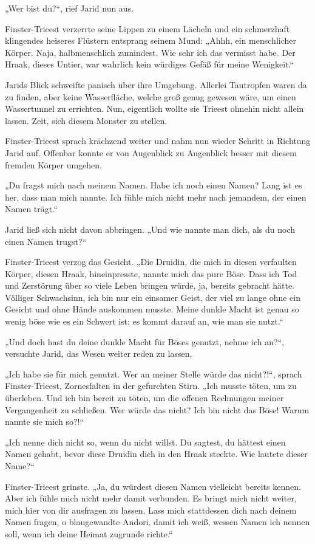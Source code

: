 „Wer bist du?“, rief Jarid nun aus.

Finster-Trieest verzerrte seine Lippen zu einem Lächeln und ein schmerzhaft klingendes heiseres Flüstern entsprang seinem Mund: „Ahhh, ein menschlicher Körper. Naja, halbmenschlich zumindest. Wie sehr ich das vermisst habe. Der Hraak, dieses Untier, war wahrlich kein würdiges Gefäß für meine Wenigkeit.“

Jarids Blick schweifte panisch über ihre Umgebung. Allerlei Tautropfen waren da zu finden, aber keine Wasserfläche, welche groß genug gewesen wäre, um einen Wassertunnel zu errichten. Nun, eigentlich wollte sie Trieest ohnehin nicht allein lassen. Zeit, sich diesem Monster zu stellen.

Finster-Trieest sprach krächzend weiter und nahm nun wieder Schritt in Richtung Jarid auf. Offenbar konnte er von Augenblick zu Augenblick besser mit diesem fremden Körper umgehen.

„Du fragst mich nach meinem Namen. Habe ich noch einen Namen? Lang ist es her, dass man mich nannte. Ich fühle mich nicht mehr nach jemandem, der einen Namen trägt.“

Jarid ließ sich nicht davon abbringen. „Und wie nannte man dich, als du noch einen Namen trugst?“

Finster-Trieest verzog das Gesicht. „Die Druidin, die mich in diesen verfaulten Körper, diesen Hraak, hineinpresste, nannte mich das pure Böse. Dass ich Tod und Zerstörung über so viele Leben bringen würde, ja, bereits gebracht hätte. Völliger Schwachsinn, ich bin nur ein einsamer Geist, der viel zu lange ohne ein Gesicht und ohne Hände auskommen musste. Meine dunkle Macht ist genau so wenig böse wie es ein Schwert ist; es kommt darauf an, wie man sie nutzt.“

„Und doch hast du deine dunkle Macht für Böses genutzt, nehme ich an?“, versuchte Jarid, das Wesen weiter reden zu lassen,

„Ich habe sie für mich genutzt. Wer an meiner Stelle würde das nicht?!“, sprach Finster-Trieest, Zornesfalten in der gefurchten Stirn. „Ich musste töten, um zu überleben. Und ich bin bereit zu töten, um die offenen Rechnungen meiner Vergangenheit zu schließen. Wer würde das nicht? Ich bin nicht das Böse! Warum nannte sie mich so?!“

„Ich nenne dich nicht so, wenn du nicht willst. Du sagtest, du hättest einen Namen gehabt, bevor diese Druidin dich in den Hraak steckte. Wie lautete dieser Name?“

Finster-Trieest grinste. „Ja, du würdest diesen Namen vielleicht bereits kennen. Aber ich fühle mich nicht mehr damit verbunden. Es bringt mich nicht weiter, mich hier von dir ausfragen zu lassen. Lass mich stattdessen dich nach deinem Namen fragen, o blaugewandte Andori, damit ich weiß, wessen Namen ich nennen soll, wenn ich deine Heimat zugrunde richte.“

